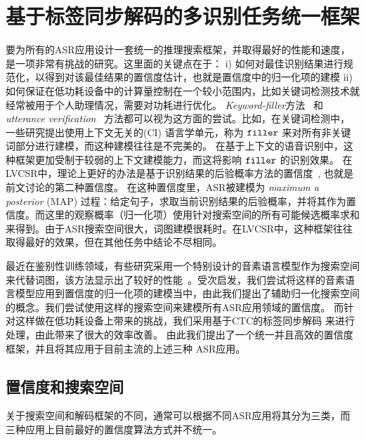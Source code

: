 \section{基于标签同步解码的多识别任务统一框架}
\label{chap:unify-framework}

要为所有的ASR应用设计一套统一的推理搜索框架，并取得最好的性能和速度，是一项非常有挑战的研究。这里面的关键点在于： i) 如何对最佳识别结果进行规范化，以得到对该最佳结果的置信度估计，也就是置信度中的归一化项的建模
    ii) 如何保证在低功耗设备中的计算量控制在一个较小范围内，比如关键词检测技术就经常被用于个人助理情况，需要对功耗进行优化。
    {\em Keyword-filler}方法~\cite{young1994detecting} 和 {\em utterance verification}~\cite{rose1995training} 方法都可以视为这方面的尝试。比如，在关键词检测中，一些研究提出使用上下文无关的(CI) 语言学单元，称为 $\tt filler$ 来对所有非关键词部分进行建模，而这种建模往往是不完美的。
    在基于上下文的语音识别中，这种框架更加受制于较弱的上下文建模能力，而这将影响 $\tt filler$ 的识别效果。
    在LVCSR中，理论上更好的办法是基于识别结果的后验概率方法的置信度~\cite{wessel2001confidence}, 也就是前文讨论的第二种置信度。 在这种置信度里，ASR被建模为  {\em maximum a posterior} (MAP) 过程：给定句子，求取当前识别结果的后验概率，并将其作为置信度。而这里的观察概率（归一化项）使用针对搜索空间的所有可能候选概率求和来得到。由于ASR搜索空间很大，词图建模很耗时。在LVCSR中，这种框架往往取得最好的效果，但在其他任务中结论不尽相同。

    最近在鉴别性训练领域，有些研究采用一个特别设计的音素语言模型作为搜索空间来代替词图，该方法显示出了较好的性能~\cite{chen2006advances}\cite{povey2016purely}。受次启发，我们尝试将这样的音素语言模型应用到置信度的归一化项的建模当中，由此我们提出了辅助归一化搜索空间的概念。我们尝试使用这样的搜索空间来建模所有ASR应用领域的置信度。 %
    而针对这样做在低功耗设备上带来的挑战，我们采用基于CTC的标签同步解码\cite{Chen+2016} 来进行处理，由此带来了很大的效率改善。
    由此我们提出了一个统一并且高效的置信度框架，并且将其应用于目前主流的上述三种 ASR应用。

  \subsection{置信度和搜索空间}
  \label{Sec:conf-search-space}

  关于搜索空间和解码框架的不同，通常可以根据不同ASR应用将其分为三类，而三种应用上目前最好的置信度算法方式并不统一。

